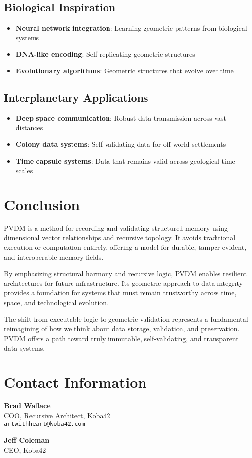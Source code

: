 \documentclass[12pt,a4paper]{article}
\begin{document}
\subsection{Biological Inspiration}
\begin{itemize}
    \item \textbf{Neural network integration}: Learning geometric patterns from biological systems
    \item \textbf{DNA-like encoding}: Self-replicating geometric structures
    \item \textbf{Evolutionary algorithms}: Geometric structures that evolve over time
\end{itemize}

\subsection{Interplanetary Applications}
\begin{itemize}
    \item \textbf{Deep space communication}: Robust data transmission across vast distances
    \item \textbf{Colony data systems}: Self-validating data for off-world settlements
    \item \textbf{Time capsule systems}: Data that remains valid across geological time scales
\end{itemize}

\section{Conclusion}

PVDM is a method for recording and validating structured memory using dimensional vector relationships and recursive topology. It avoids traditional execution or computation entirely, offering a model for durable, tamper-evident, and interoperable memory fields.

By emphasizing structural harmony and recursive logic, PVDM enables resilient architectures for future infrastructure. Its geometric approach to data integrity provides a foundation for systems that must remain trustworthy across time, space, and technological evolution.

The shift from executable logic to geometric validation represents a fundamental reimagining of how we think about data storage, validation, and preservation. PVDM offers a path toward truly immutable, self-validating, and transparent data systems.

\section{Contact Information}

\textbf{Brad Wallace}\\
COO, Recursive Architect, Koba42\\
\texttt{artwithheart@koba42.com}

\textbf{Jeff Coleman}\\
CEO, Koba42
\end{document}

